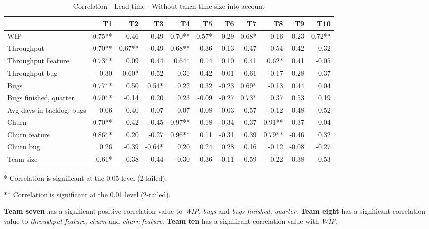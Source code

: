 \documentclass[UKenglish]{ifimaster}  %
\begin{document}
\begin{minipage}[t]{\linewidth}
\begin{table}[H]
 \begin{adjustwidth}{-1.5cm}{}
 \centering
 \begin{tabular}{|l|r|r|r|r|r|r|r|r|r|r|}
\hline
 & \bf{T1} & \bf{T2} & \bf{T3} & \bf{T4} & \bf{T5} & \bf{T6} & \bf{T7} & \bf{T8} & \bf{T9} & \bf{T10}\\ \hline
 WIP  & 0.75** & 0.46 & 0.49 & 0.70** & 0.57* & 0.29 & 0.68* & 0.16 & 0.23 & 0.72** \\ \hline
 Throughput  & 0.70** & 0.67** & 0.49 & 0.68** & 0.36 & 0.13 & 0.47 & 0.54 & 0.42 & 0.32 \\ \hline
 Throughput Feature  & 0.73** & 0.09 & 0.44 & 0.64* & 0.14 & 0.10 & 0.41 & 0.62* & 0.41 & -0.05 \\ \hline
 Throughput bug  & -0.30 & 0.60* & 0.52 & 0.31 & 0.42 & -0.01 & 0.61 & -0.17 & 0.28 & 0.37 \\ \hline
 Bugs  & 0.77** & 0.50 & 0.54* & 0.22 & 0.32 & -0.23 & 0.69* & -0.13 & 0.44 & 0.04 \\ \hline
 Bugs finished, quarter  & 0.70** & -0.14 & 0.20 & 0.23 & -0.09 & -0.27 & 0.73* & 0.37 & 0.53 & 0.19 \\ \hline
 Avg days in backlog, bugs  & 0.06 & 0.40 & 0.07 & 0.07 & -0.08 & -0.03 & 0.57 & -0.12 & -0.48 & -0.52 \\ \hline
 Churn  & 0.70** & -0.42 & -0.45 & 0.97** & 0.18 & -0.34 & 0.37 & 0.91** & -0.37 & -0.04 \\ \hline
 Churn feature  & 0.86** & 0.20 & -0.27 & 0.96** & 0.11 & -0.31 & 0.39 & 0.79** & -0.46 & 0.32 \\ \hline
 Churn bug  & 0.26 & -0.39 & -0.64* & 0.20 & 0.24 & 0.28 & 0.16 & -0.12 & -0.08 & -0.27 \\ \hline
 Team size  & 0.61* & 0.38 & 0.44 & -0.30 & 0.36 & -0.11 & 0.59 & 0.22 & 0.38 & 0.53 \\ \hline
\end{tabular}
 \caption{Correlation - Lead time - Without taken time size into account}
 \label{corr:lt}
 \centerline {* Correlation is significant at the 0.05 level (2-tailed).}
\centerline{** Correlation is significant at the 0.01 level (2-tailed).}
\end{adjustwidth}
\end{table}
\end{minipage}

\textbf{Team seven} has a significant positive correlation value to \textit{WIP}, \textit{bugs} and \textit{bugs finished, quarter}. \textbf{Team eight} has a significant correlation value to \textit{throughput feature}, \textit{churn} and \textit{churn feature}. \textbf{Team ten} has a significant correlation value with \textit{WIP}.
\end{document}
